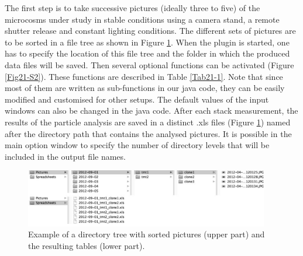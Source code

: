 The first step is to take successive pictures (ideally three to five) of the
microcosms under study in stable conditions using a camera stand, a remote
shutter release and constant lighting conditions. The different sets of pictures
are to be sorted in a file tree as shown in Figure \ref{Fig21-S1}. When the plugin is
started, one has to specify the location of this file tree and the folder in
which the produced data files will be saved. Then several optional functions can
be activated (Figure \ref{Fig21-S2}). These functions are described in Table \ref{Tab21-1}. Note that
since most of them are written as sub-functions in our java code, they can be
easily modified and customised for other setups. The default values of the input
windows can also be changed in the java code. After each stack measurement,
the results of the particle analysis are saved in a distinct .xls files
(Figure \ref{Fig21-S1}) named after the directory path that contains the analysed pictures.
It is possible in the main option window to specify the number of directory
levels that will be included in the output file names.

\begin{figure}[!h] %
\centering
\includegraphics[width=0.95\textwidth]{2_Methodo/Fig/FigS1.pdf}
\caption[  Example of a directory tree and
resulting tables]{ Example of a directory tree with sorted pictures (upper part)
and the resulting tables (lower part).
}
\label{Fig21-S1}
\end{figure}

